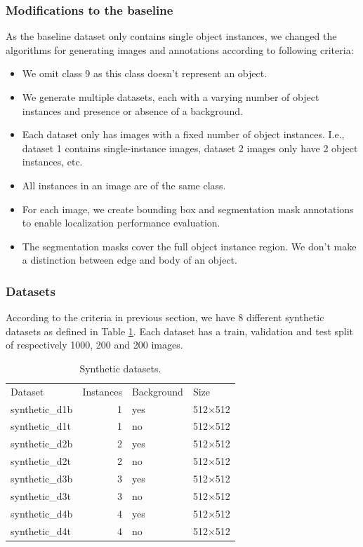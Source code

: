 \subsubsection{Modifications to the baseline}
As the baseline dataset only contains single object instances, we changed the algorithms for generating images and annotations according to following criteria:
\begin{itemize}
    \item We omit class 9 as this class doesn't represent an object.
    \item We generate multiple datasets, each with a varying number of object instances and presence or absence of a background.
    \item Each dataset only has images with a fixed number of object instances. I.e., dataset 1 contains single-instance images, dataset 2 images only have 2 object instances, etc.
    \item All instances in an image are of the same class.
    \item For each image, we create bounding box and segmentation mask annotations to enable localization performance evaluation.
    \item The segmentation masks cover the full object instance region. We don't make a distinction between edge and body of an object.
\end{itemize}

\subsubsection{Datasets}
According to the criteria in previous section, we have 8 different synthetic datasets as defined in Table \ref{tab:synthetic_datasets}. Each dataset has a train, validation and test split of respectively 1000, 200 and 200 images.

\begin{table}[ht]
\centering
\begin{tabular}{lrll}
  \toprule
  Dataset & Instances & Background & Size\\
  \cmidrule(lr){1-4}
  synthetic\_d1b & 1 & yes & 512$\times$512\\
  synthetic\_d1t & 1 & no & 512$\times$512\\
  synthetic\_d2b & 2 & yes & 512$\times$512\\
  synthetic\_d2t & 2 & no & 512$\times$512\\
  synthetic\_d3b & 3 & yes & 512$\times$512\\
  synthetic\_d3t & 3 & no & 512$\times$512\\
  synthetic\_d4b & 4 & yes & 512$\times$512\\
  synthetic\_d4t & 4 & no & 512$\times$512\\
  \bottomrule
\end{tabular}
\caption[Synthetic datasets]{Synthetic datasets.}
\label{tab:synthetic_datasets}
\end{table}

